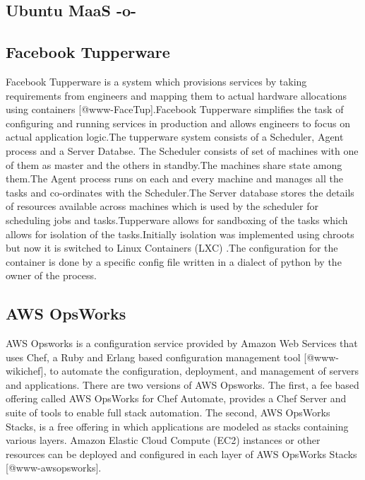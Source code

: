 \subsection{Ubuntu MaaS -o-}



\subsection{Facebook Tupperware}

Facebook Tupperware is a system which provisions services by taking
requirements from engineers and mapping them to actual hardware
allocations using containers [@www-FaceTup].Facebook Tupperware
simplifies the task of configuring and running services in production
and allows engineers to focus on actual application logic.The
tupperware system consists of a Scheduler, Agent process and a Server
Databse.  The Scheduler consists of set of machines with one of them
as master and the others in standby.The machines share state among
them.The Agent process runs on each and every machine and manages all
the tasks and co-ordinates with the Scheduler.The Server database
stores the details of resources available across machines which is
used by the scheduler for scheduling jobs and tasks.Tupperware allows
for sandboxing of the tasks which allows for isolation of the
tasks.Initially isolation was implemented using chroots but now it is
switched to Linux Containers (LXC) .The configuration for the
container is done by a specific config file written in a dialect of
python by the owner of the process.

\subsection{AWS OpsWorks}

AWS Opsworks is a configuration service provided by Amazon Web
Services that uses Chef, a Ruby and Erlang based configuration
management tool [@www-wikichef], to automate the configuration,
deployment, and management of servers and applications. There are two
versions of AWS Opsworks.  The first, a fee based offering called AWS
OpsWorks for Chef Automate, provides a Chef Server and suite of tools
to enable full stack automation. The second, AWS OpsWorks Stacks, is a
free offering in which applications are modeled as stacks containing
various layers. Amazon Elastic Cloud Compute (EC2) instances or other
resources can be deployed and configured in each layer of AWS OpsWorks
Stacks [@www-awsopsworks].

